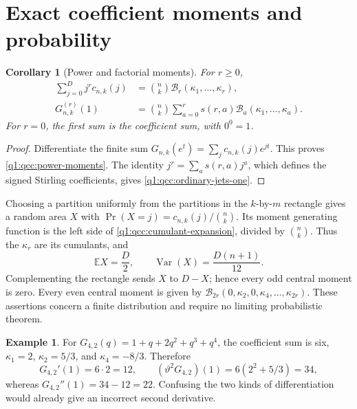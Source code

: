 \documentclass[11pt,a4paper,oneside,openany]{book}
\newtheorem{corollary}[theorem]{Corollary}
\theoremstyle{definition}
\newtheorem{example}[theorem]{Example}
\theoremstyle{remark}
\newcommand{\Y}[1]{\mathcal B_{#1}}
\DeclareMathOperator{\Var}{Var}
\newcommand{\E}{\mathbb E}
\newcommand{\logq}{\vartheta}
\begin{document}
\section{Exact coefficient moments and probability}
\begin{corollary}[Power and factorial moments]\label{q1:qcc:moment-formulas}
For \(r\ge0\),
\begin{align}
 \sum_{j=0}^{D}j^r c_{n,k}(j)
 &=\binom nk\Y r(\kappa_1,\ldots,\kappa_r),
       \label{q1:qcc:power-moments}\\
 G_{n,k}^{(r)}(1)
 &=\binom nk\sum_{a=0}^r s(r,a)
           \Y a(\kappa_1,\ldots,\kappa_a).
       \label{q1:qcc:ordinary-jets-one}
\end{align}
For \(r=0\), the first sum is the coefficient sum, with \(0^0=1\).
\end{corollary}
\begin{proof}
Differentiate the finite sum \(G_{n,k}(e^t)=\sum_jc_{n,k}(j)e^{jt}\).
This proves \eqref{q1:qcc:power-moments}. The identity
\(j^{\underline r}=\sum_a s(r,a)j^a\), which defines the signed
Stirling coefficients, gives \eqref{q1:qcc:ordinary-jets-one}.
\end{proof}

Choosing a partition uniformly from the partitions in the \(k\)-by-\(m\)
rectangle gives a random area \(X\) with
\(\Pr(X=j)=c_{n,k}(j)/\binom nk\). Its moment generating function is the
left side of \eqref{q1:qcc:cumulant-expansion}, divided by \(\binom nk\).
Thus the \(\kappa_r\) are its cumulants, and
\begin{equation}\label{q1:qcc:area-statistics}
 \E X=\frac D2,\qquad \Var(X)=\frac{D(n+1)}{12}.
\end{equation}
Complementing the rectangle sends \(X\) to \(D-X\); hence every odd
central moment is zero. Every even central moment is given by
\(\Y{2r}(0,\kappa_2,0,\kappa_4,\ldots,\kappa_{2r})\).
These assertions concern a finite distribution and require no limiting
probabilistic theorem.

\begin{example}
For \(G_{4,2}(q)=1+q+2q^2+q^3+q^4\), the coefficient sum is six,
\(\kappa_1=2\), \(\kappa_2=5/3\), and \(\kappa_4=-8/3\).
Therefore
\[
 G_{4,2}'(1)=6\cdot2=12,\qquad
 (\logq^2G_{4,2})(1)=6(2^2+5/3)=34,
\]
whereas
\(G_{4,2}''(1)=34-12=22\). Confusing the two kinds of differentiation
would already give an incorrect second derivative.
\end{example}
\end{document}
